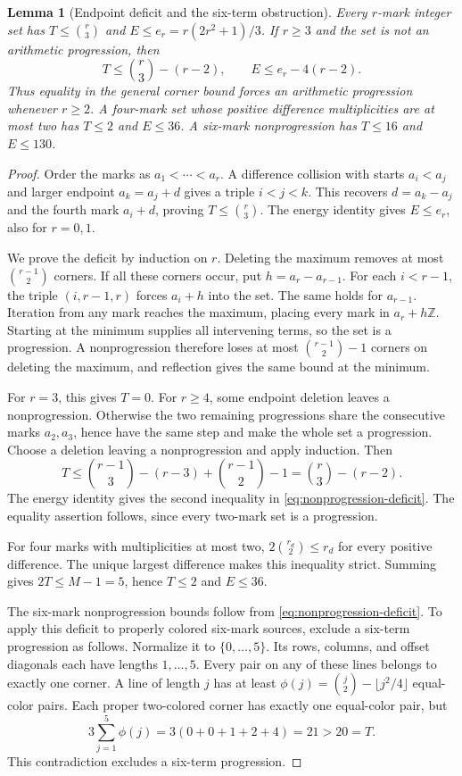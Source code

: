 \documentclass[11pt,a4paper]{article}
\newtheorem{lemma}[theorem]{Lemma}
\theoremstyle{definition}
\newcommand{\Z}{\mathbb Z}
\numberwithin{equation}{section}
\begin{document}
\begin{lemma}[Endpoint deficit and the six-term obstruction]\label{lem:small}
Every $r$-mark integer set has $T\le\binom r3$ and $E\le e_r=r(2r^2+1)/3$. If $r\ge3$ and the set is not an arithmetic progression, then
\begin{equation}\label{eq:nonprogression-deficit}
T\le\binom r3-(r-2),\qquad E\le e_r-4(r-2).
\end{equation}
Thus equality in the general corner bound forces an arithmetic progression whenever $r\ge2$. A four-mark set whose positive difference multiplicities are at most two has $T\le2$ and $E\le36$. A six-mark nonprogression has $T\le16$ and $E\le130$.
\end{lemma}
\begin{proof}
Order the marks as $a_1<\cdots<a_r$. A difference collision with starts $a_i<a_j$ and larger endpoint $a_k=a_j+d$ gives a triple $i<j<k$. This recovers $d=a_k-a_j$ and the fourth mark $a_i+d$, proving $T\le\binom r3$. The energy identity gives $E\le e_r$, also for $r=0,1$.

We prove the deficit by induction on $r$. Deleting the maximum removes at most $\binom{r-1}{2}$ corners. If all these corners occur, put $h=a_r-a_{r-1}$. For each $i<r-1$, the triple $(i,r-1,r)$ forces $a_i+h$ into the set. The same holds for $a_{r-1}$. Iteration from any mark reaches the maximum, placing every mark in $a_r+h\Z$. Starting at the minimum supplies all intervening terms, so the set is a progression. A nonprogression therefore loses at most $\binom{r-1}{2}-1$ corners on deleting the maximum, and reflection gives the same bound at the minimum.

For $r=3$, this gives $T=0$. For $r\ge4$, some endpoint deletion leaves a nonprogression. Otherwise the two remaining progressions share the consecutive marks $a_2,a_3$, hence have the same step and make the whole set a progression. Choose a deletion leaving a nonprogression and apply induction. Then
\[
T\le\binom{r-1}{3}-(r-3)+\binom{r-1}{2}-1
=\binom r3-(r-2).
\]
The energy identity gives the second inequality in \eqref{eq:nonprogression-deficit}. The equality assertion follows, since every two-mark set is a progression.

For four marks with multiplicities at most two, $2\binom{r_d}{2}\le r_d$ for every positive difference. The unique largest difference makes this inequality strict. Summing gives $2T\le M-1=5$, hence $T\le2$ and $E\le36$.

The six-mark nonprogression bounds follow from \eqref{eq:nonprogression-deficit}. To apply this deficit to properly colored six-mark sources, exclude a six-term progression as follows. Normalize it to $\{0,\ldots,5\}$. Its rows, columns, and offset diagonals each have lengths $1,\ldots,5$. Every pair on any of these lines belongs to exactly one corner. A line of length $j$ has at least $\phi(j)=\binom j2-\lfloor j^2/4\rfloor$ equal-color pairs. Each proper two-colored corner has exactly one equal-color pair, but
\[
3\sum_{j=1}^5\phi(j)=3(0+0+1+2+4)=21>20=T.
\]
This contradiction excludes a six-term progression.
\end{proof}
\end{document}
